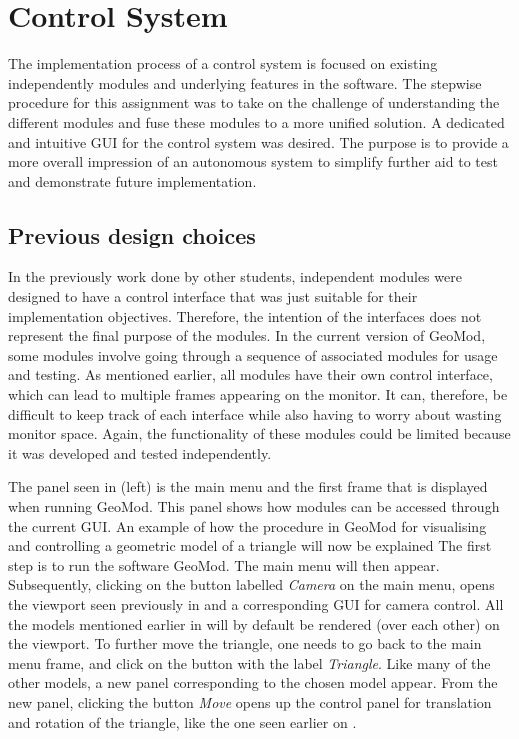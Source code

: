 \chapter{Control System}

The implementation process of a control system is focused on existing independently modules and underlying features in the software. The stepwise procedure for this assignment was to take on the challenge of understanding the different modules and fuse these modules to a more unified solution. A dedicated and intuitive GUI for the control system was desired. The purpose is to provide a more overall impression of an autonomous system to simplify further aid to test and demonstrate future implementation.

\section{Previous design choices}

In the previously work done by other students, independent modules were designed to have a control interface that was just suitable for their implementation objectives. Therefore, the intention of the interfaces does not represent the final purpose of the modules. In the current version of GeoMod, some modules involve going through a sequence of associated modules for usage and testing. As mentioned earlier, all modules have their own control interface,  which can lead to multiple frames appearing on the monitor. It can, therefore, be difficult to keep track of each interface while also having to worry about wasting monitor space. Again, the functionality of these modules could be limited because it was developed and tested independently.

\label{chap:example}
The panel seen in  (left) is the main menu and the first frame that is displayed when running GeoMod. This panel shows how modules can be accessed through the current GUI.
An example of how the procedure in GeoMod for visualising and controlling a geometric model of a triangle will now be explained The first step is to run the software GeoMod. The main menu will then appear. Subsequently, clicking on the button labelled \textit{Camera} on the main menu, opens the viewport seen previously in  and a corresponding GUI for camera control. All the models mentioned earlier in  will by default be rendered (over each other) on the viewport. To further move the triangle, one needs to go back to the main menu frame, and click on the button with the label \textit{Triangle}. Like many of the other models, a new panel corresponding to the chosen model appear. From the new panel, clicking the button \textit{Move} opens up the control panel for translation and rotation of the triangle, like the one seen earlier on .

